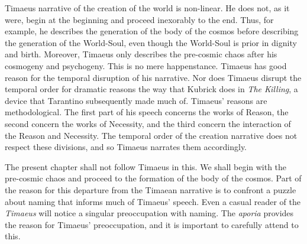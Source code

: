 Timaeus narrative of the creation of the world is non-linear. He does not, as it were, begin at the beginning and proceed inexorably to the end. Thus, for example, he describes the generation of the body of the cosmos before describing the generation of the World-Soul, even though the World-Soul is prior in dignity and birth. Moreover, Timaeus only describes the pre-cosmic chaos after his cosmogeny and psychogeny. This is no mere happenstance. Timaeus has good reason for the temporal disruption of his narrative. Nor does Timaeus disrupt the temporal order for dramatic reasons the way that Kubrick does in \emph{The Killing}, a device that Tarantino subsequently made much of. Timaeus' reasons are methodological. The first part of his speech concerns the works of Reason, the second concern the works of Necessity, and the third concern the interaction of the Reason and Necessity. The temporal order of the creation narrative does not respect these divisions, and so Timaeus narrates them accordingly.

The present chapter shall not follow Timaeus in this. We shall begin with the pre-cosmic chaos and proceed to the formation of the body of the cosmos. Part of the reason for this departure from the Timaean narrative is to confront a puzzle about naming that informs much of Timaeus' speech. Even a casual reader of the \emph{Timaeus} will notice a singular preoccupation with naming. The \emph{aporia} provides the reason for Timaeus' preoccupation, and it is important to carefully attend to this.




